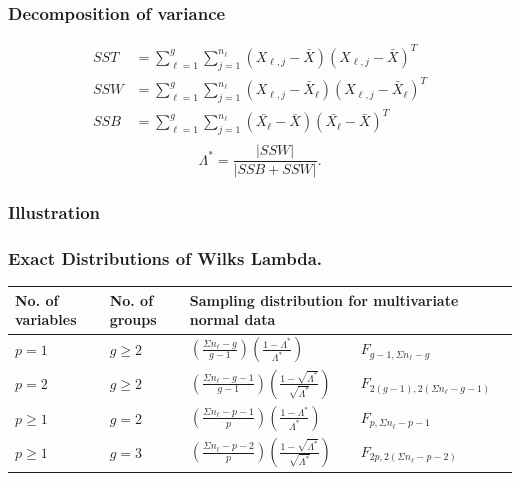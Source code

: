 \documentclass[aspectratio=169,10pt,t]{beamer}
\begin{document}
\begin{frame}[t]
	\frametitle{Decomposition of variance}
	\[
		\begin{aligned}
			SST &=
			\sum^{g}_{\ell=1} 
			\sum^{n_{\ell}}_{j=1} 
			\left( X_{\ell,j}- \bar{X} \right) 
			\left( X_{\ell,j}- \bar{X} \right) ^{T}\\
			SSW &=
			\sum^{g}_{\ell=1} 
			\sum^{n_{\ell}}_{j=1} 
			\left( X_{\ell,j}- \bar{X}_{\ell} \right) 
			\left( X_{\ell,j}- \bar{X}_{\ell} \right) ^{T}\\
			SSB &=
			\sum^{g}_{\ell=1} 
			\sum^{n_\ell}_{j=1} 
			\left( \bar{X_{\ell}}- \bar{X} \right) 
			\left( \bar{X_{\ell}}- \bar{X} \right) ^{T}\\
		\end{aligned}
	\] 
	\vspace{1cm}
	\pause
	\[
		\Lambda ^{*} = \frac{|SSW|}{|SSB + SSW |} 
	.\] 

\end{frame}

\begin{frame}[t]
	\frametitle{Illustration}
	\begin{figure}[H]
		\vspace{-1cm}
		\scalebox{0.8}{
		
	}
	\end{figure} 
\end{frame}
\begin{frame}[t]
	\frametitle{Exact Distributions of Wilks Lambda.}


	\begin{tabular}{lll@{$\sim$}l}
		\toprule
		No. of variables & No. of groups &
		\multicolumn{2}{l}{Sampling distribution for multivariate normal data}\\
		\midrule
		$p=1$ & $g\geq 2$ & 
		$  \left( \frac{\Sigma n_{\ell}-g}{g-1} \right)
		\left( \frac{1-\Lambda^{*}}{\Lambda^{*}}   \right) 
		$
			& $ F_{g-1,\Sigma n_{\ell}-g} $
		 \\
		$p=2$ & $g\geq 2$ & 
		$  \left( \frac{\Sigma n_{\ell}-g-1}{g-1} \right)
		\left( \frac{1- \sqrt{ \Lambda^{*}}}{\sqrt{ \Lambda^{*}} }  \right) 
		$&$
		 F_{2 \left( g-1 \right) ,2 \left( \Sigma n_{\ell}-g-1 \right) }
		$\\
		$p\geq 1$ & $g = 2$ & 
		$  \left( \frac{\Sigma n_{\ell}-p-1}{p} \right)
		\left( \frac{1-\Lambda^{*}}{\Lambda^{*}}  \right) 
		$&$
		 F_{p,\Sigma n_{\ell}-p-1}
		$\\
		$p\geq 1$ & $g = 3$ & 
		$  \left( \frac{\Sigma n_{\ell}-p-2}{p} \right)
		\left( \frac{1- \sqrt{ \Lambda^{*}}}{\sqrt{ \Lambda^{*}} }  \right) 
		$&$
		 F_{2p,2  \left( \Sigma n_{\ell}-p-2 \right) }
		$
	\end{tabular}
	
\end{frame}
\end{document}
